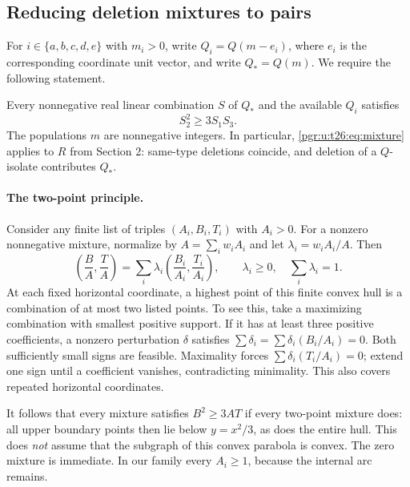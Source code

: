 \documentclass[11pt]{article}
\numberwithin{equation}{section}
\theoremstyle{definition}\newtheorem{definition}[theorem]{Definition}\newtheorem{remark}[theorem]{Remark}
\begin{document}
\subsection{Reducing deletion mixtures to pairs}
For $i\in\{a,b,c,d,e\}$ with $m_i>0$, write $Q_i=Q(m-e_i)$, where $e_i$ is the corresponding coordinate unit vector, and write $Q_*=Q(m)$. We require the following statement.

\begin{lemma}\label{pgr:u:t26:lem:mixtures}
Every nonnegative real linear combination $S$ of $Q_*$ and the available $Q_i$ satisfies
\begin{equation}\label{pgr:u:t26:eq:mixture}
S_2^2\ge3S_1S_3.
\end{equation}
The populations $m$ are nonnegative integers. In particular, \eqref{pgr:u:t26:eq:mixture} applies to $R$ from Section 2: same-type deletions coincide, and deletion of a $Q$-isolate contributes $Q_*$.
\end{lemma}

\paragraph{The two-point principle.}
Consider any finite list of triples $(A_i,B_i,T_i)$ with $A_i>0$. For a nonzero nonnegative mixture, normalize by $A=\sum_iw_iA_i$ and let $\lambda_i=w_iA_i/A$. Then
\[
\left(\frac BA,\frac TA\right)
=\sum_i\lambda_i\left(\frac{B_i}{A_i},\frac{T_i}{A_i}\right),
\qquad \lambda_i\ge0,\quad\sum_i\lambda_i=1.
\]
At each fixed horizontal coordinate, a highest point of this finite convex hull is a combination of at most two listed points. To see this, take a maximizing combination with smallest positive support. If it has at least three positive coefficients, a nonzero perturbation $\delta$ satisfies $\sum\delta_i=\sum\delta_i(B_i/A_i)=0$. Both sufficiently small signs are feasible. Maximality forces $\sum\delta_i(T_i/A_i)=0$; extend one sign until a coefficient vanishes, contradicting minimality. This also covers repeated horizontal coordinates.

It follows that every mixture satisfies $B^2\ge3AT$ if every two-point mixture does: all upper boundary points then lie below $y=x^2/3$, as does the entire hull. This does \emph{not} assume that the subgraph of this convex parabola is convex. The zero mixture is immediate. In our family every $A_i\ge1$, because the internal arc remains.
\end{document}
